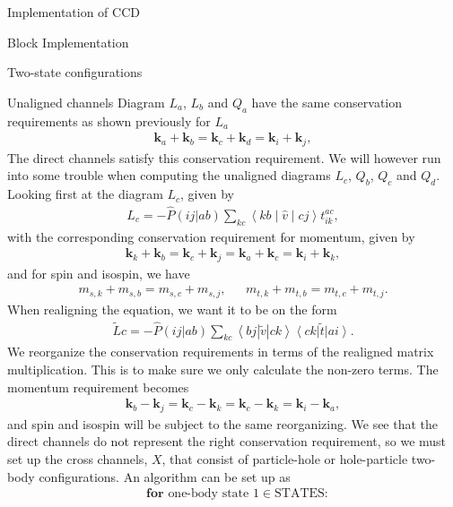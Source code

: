 \documentclass[twoside,english]{uiofysmaster}
\begin{document}
\begin{chapter}{Implementation of CCD}
\begin{section}{Block Implementation}
\begin{subsection}{Two-state configurations}
		\end{subsection}
		
		\begin{subsection}{Unaligned channels}
			Diagram $L_a$, $L_b$ and $Q_a$ have the same conservation requirements as shown previously for $L_a$
			\begin{align}
			 	\mathbf{k}_a + \mathbf{k}_b = \mathbf{k}_c + \mathbf{k}_d = \mathbf{k}_i + \mathbf{k}_j ,
			\end{align}
			The direct channels satisfy this conservation requirement. We will however run into some trouble when computing the unaligned diagrams $L_c$, $Q_b$, $Q_c$ and $Q_d$. Looking first at the diagram $L_c$, given by 
			\begin{align}
				L_c = - \hat P(ij|ab) \sum_{kc} \left<kb\middle|\hat v\middle| cj \right> t_{ik}^{ac},
			\end{align}
			with the corresponding conservation requirement for momentum, given by
			\begin{align}
				\mathbf{k}_k + \mathbf{k}_b = \mathbf{k}_c + \mathbf{k}_j = \mathbf{k}_a + \mathbf{k}_c = \mathbf{k}_i + \mathbf{k}_k,
			\end{align}
			and for spin and isospin, we have
			\begin{align}
				m_{s,k} + m_{s,b} = m_{s,c} + m_{s,j},  \:\:\:\:\:\:\: m_{t,k} + m_{t,b} = m_{t,c} + m_{t,j}. 
			\end{align}
			When realigning the equation, we want it to be on the form
			\begin{align}
				\tilde Lc = -\hat P(ij|ab) \sum_{kc} \left<bj | \tilde v | ck \right> \left< ck \right| \tilde t \left| ai \right>.
			\end{align}
			We reorganize the conservation requirements in terms of the realigned matrix multiplication. This is to make sure we only calculate the non-zero terms. The momentum requirement becomes 
			\begin{align}
				\mathbf{k}_b - \mathbf{k}_j = \mathbf{k}_c - \mathbf{k}_k = \mathbf{k}_c - \mathbf{k}_k = \mathbf{k}_i - \mathbf{k}_a,
			\end{align}
			and spin and isospin will be subject to the same reorganizing. We see that the direct channels do not represent the right conservation requirement, so we must set up the cross channels, $X$, that consist of particle-hole or hole-particle two-body configurations. An algorithm can be set up as
			\begin{align*}
				&\mathbf{for } \text{ one-body state 1} \in \text{STATES}:\\

\end{align*}
\end{subsection}
\end{section}
\end{chapter}
\end{document}
